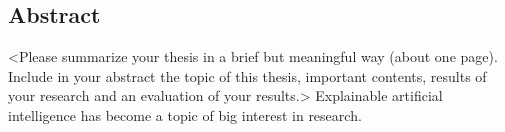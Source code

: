 %
\pagestyle{empty}

\subsection*{Abstract}

<Please summarize your thesis in a brief but meaningful way (about one page). Include in your abstract the topic of this thesis, important contents, results of your research and an evaluation of your results.> Explainable artificial intelligence has become a topic of big interest in research. 

\cleardoublepage
